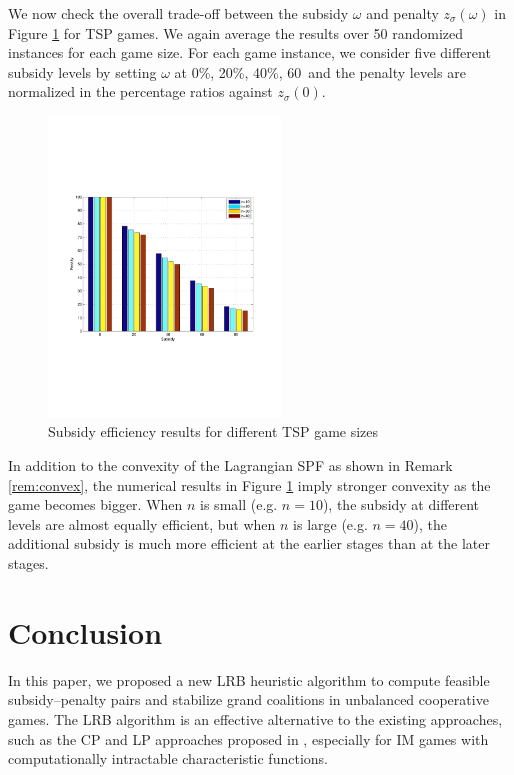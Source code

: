 \documentclass[authoryear,review,12pt]{elsarticle}
\begin{document}
We now check the overall trade-off between the subsidy $\omega$ and penalty $z_{\sigma}(\omega)$ in Figure \ref{figure:differentsize} for TSP games.
We again average the results over 50 randomized instances for each game size.
For each game instance, we consider five different subsidy levels by setting $\omega$ at 0\%, 20\%, 40\%, 60\,%
and the penalty levels are normalized in the percentage ratios against $z_{\sigma}(0)$.
\begin{figure}[H]
\centering
\includegraphics[width=0.55\textwidth]{DifferentSize1.pdf}
\centering
\caption{\label{figure:differentsize}Subsidy efficiency results for different TSP game sizes}
\end{figure}

In addition to the convexity of the Lagrangian SPF as shown in Remark \ref{rem:convex}, the numerical results in Figure \ref{figure:differentsize} imply stronger convexity as the game becomes bigger.
When $n$ is small (e.g. $n = 10$), the subsidy at different levels are almost equally efficient, but when $n$ is large (e.g. $n = 40$), the additional subsidy is much more efficient at the earlier stages than at the later stages.





\section{Conclusion}\label{section:conclusion}
In this paper, we proposed a new LRB heuristic algorithm to compute feasible subsidy--penalty pairs and stabilize grand coalitions in unbalanced cooperative games.
The LRB algorithm is an effective alternative to the existing approaches, such as the CP and LP approaches proposed in \cite{leastcore2018}, especially for IM games with computationally intractable characteristic functions.
\end{document}
